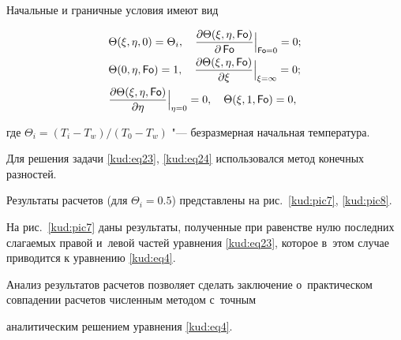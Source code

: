Начальные и граничные условия имеют вид

\begin{equation}

\label{kud:eq24}

\begin{aligned}

&\Theta (\xi ,\eta,0)= \Theta_ {i},

\quad

\frac{\partial  \Theta(\xi,\eta,\operatorname{\sf Fo})}{\partial \operatorname{\sf Fo}}\Big|_{\operatorname{\sf Fo}=0}=0; \\

& \Theta(0, \eta,\operatorname{\sf Fo})=1, \quad 

\frac{\partial  \Theta(\xi, \eta, \operatorname{\sf Fo})}{\partial  \xi}\Big|_{\xi = \infty}=0;

\\

&

\frac{\partial  \Theta( \xi, \eta,\operatorname{\sf Fo})}{\partial \eta}\Big|_{\eta=0}=0, \quad 

\Theta( \xi, 1,\operatorname{\sf Fo})=0,

\end{aligned}

\end{equation}

где $\Theta_{i} =({T_ {i} -T_{w}})/({T_0

-T_{w}})$ "--- безразмерная начальная температура.



Для решения задачи \eqref{kud:eq23}, \eqref{kud:eq24} использовался метод конечных разностей.

Результаты расчетов (для $\Theta_{i} =0.5$) представлены на рис.~\ref{kud:pic7}, \ref{kud:pic8}. 

На рис.~\ref{kud:pic7} даны результаты, полученные при равенстве нулю последних слагаемых правой и~левой частей уравнения \eqref{kud:eq23}, которое в~этом случае приводится к уравнению \eqref{kud:eq4}. 

Анализ результатов расчетов позволяет сделать заключение о~практическом совпадении расчетов численным методом с~точным

аналитическим решением уравнения \eqref{kud:eq4}.




